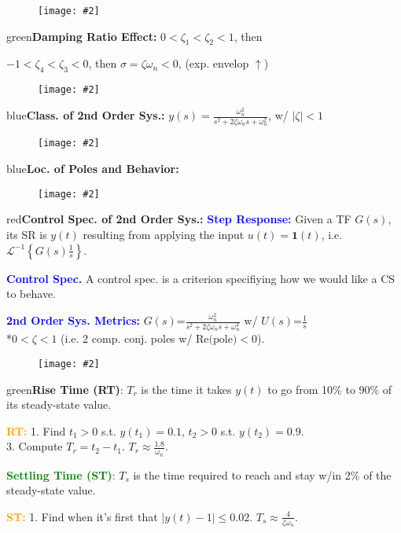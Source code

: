 \documentclass[5pt]{extarticle} %
\newcommand{\customFigure}[3][]{%
    \vspace{-1.5em}
    \begin{figure}[H]
        \centering
        \texttt{[image: \#2]}
    \end{figure}
    \vspace{-1.5em}
}
\begin{document}
\begin{paracol}{3}
{    \customFigure[0.2]{../Images/L10_5.png}

    \textcolor{green}{\textbf{Damping Ratio Effect:}} $0 < \zeta_1 < \zeta_2 < 1$, then \\

    $-1 < \zeta_4 < \zeta_3 < 0$, then $\sigma = \zeta \omega_n <0$, (exp. envelop $\uparrow$) \\
    \customFigure[0.2]{../Images/L10_4.png}

    \textcolor{blue}{\textbf{Class. of 2nd Order Sys.:}} $y(s) = \frac{\omega_n^2}{s^2 + 2\zeta\omega_n s + \omega_n^2}$, w/ $|\zeta| < 1$ \\
    \customFigure[0.2]{../Images/L10_1.png}

    \textcolor{blue}{\textbf{Loc. of Poles and Behavior:}} 
    \customFigure[0.2]{../Images/L10_2.png}

    \textcolor{red}{\textbf{Control Spec. of 2nd Order Sys.:}} \textcolor{blue}{\textbf{Step Response:}} Given a TF $G(s)$, its SR is $y(t)$ resulting from applying the input $u(t) = \mathbf{1}(t)$, i.e. $\mathcal{L}^{-1} \left\{G(s) \frac{1}{s} \right\}$.

    \textcolor{blue}{\textbf{Control Spec.}} A control spec. is a criterion specifiying how we would like a CS to behave. 


    \textcolor{blue}{\textbf{2nd Order Sys. Metrics:}} $G(s) \text{=} \frac{\omega_n^2}{s^2 + 2\zeta\omega_n s + \omega_n^2}$ w/ $U(s) \text{=} \frac{1}{s}$ \\
    *$0 < \zeta < 1$ (i.e. 2 comp. conj. poles w/ $\text{Re(pole)}<0$). 
    \customFigure[0.2]{../Images/L10_6.png}

    \textcolor{green}{\textbf{Rise Time (RT)}:} $T_r$ is the time it takes $y(t)$ to go from 10\% to 90\% of its steady-state value.

    \textcolor{orange}{\textbf{RT:}} 1. Find $t_1 > 0$ s.t. $y(t_1) = 0.1$, $t_2 > 0$ s.t. $y(t_2) = 0.9$. \\
    3. Compute $T_r = t_2 - t_1$. $\boxed{T_r \approx \frac{1.8}{\omega_n}}$. 

    \textcolor{green}{\textbf{Settling Time (ST)}:} $T_s$ is the time required to reach and stay w/in 2\% of the steady-state value.

    \textcolor{orange}{\textbf{ST:}} 1. Find when it's first that $|y(t) - 1| \leq 0.02$. $\boxed{T_s \approx \frac{4}{\zeta \omega_n}}$.

}
\end{paracol}
\end{document}
